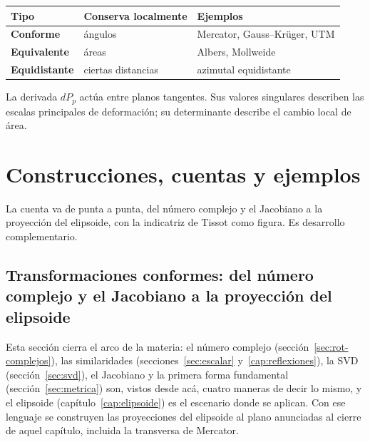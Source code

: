 \begin{center}
\begin{tabularx}{.92\textwidth}{>{\bfseries}l X X}
\toprule
Tipo & Conserva localmente & Ejemplos\\
\midrule
Conforme & ángulos & Mercator, Gauss--Krüger, UTM\\
Equivalente & áreas & Albers, Mollweide\\
Equidistante & ciertas distancias & azimutal equidistante\\
\bottomrule
\end{tabularx}
\end{center}

La derivada \(dP_p\) actúa entre planos tangentes. Sus valores singulares describen las
escalas principales de deformación; su determinante describe el cambio local de área.

\section{Construcciones, cuentas y ejemplos}

La cuenta va de punta a punta, del número complejo y el Jacobiano a la proyección del elipsoide, con la indicatriz de Tissot como figura. Es desarrollo complementario.

\subsection{Transformaciones conformes: del número complejo y el Jacobiano a la proyección del elipsoide}\label{sec:transformaciones-conformes}

{\small{}\par}


\begin{atencion}
Esta sección cierra el arco de la materia: el número complejo (sección~\ref{sec:rot-complejos}),
las similaridades (secciones~\ref{sec:escalar} y~\ref{cap:reflexiones}), la SVD
(sección~\ref{sec:svd}), el Jacobiano y la primera forma fundamental
(sección~\ref{sec:metrica}) son, vistos desde acá, cuatro maneras de decir lo mismo, y
el elipsoide (capítulo~\ref{cap:elipsoide}) es el escenario donde se aplican. Con ese
lenguaje se construyen las proyecciones del elipsoide al plano anunciadas al cierre de aquel capítulo, incluida la
transversa de Mercator.
\end{atencion}

